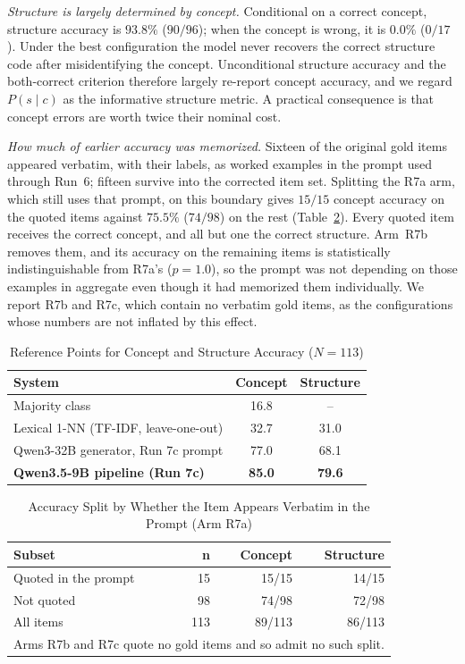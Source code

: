 \documentclass[onecolumn, 11pt]{IEEEtran}
\begin{document}
\emph{Structure is largely determined by concept.} Conditional on a correct concept, structure accuracy is $93.8\%$ ($90/96$); when the concept is wrong, it is $0.0\%$ ($0/17$). Under the best configuration the model never recovers the correct structure code after misidentifying the concept. Unconditional structure accuracy and the both-correct criterion therefore largely re-report concept accuracy, and we regard $P(s \mid c)$ as the informative structure metric. A practical consequence is that concept errors are worth twice their nominal cost.

\emph{How much of earlier accuracy was memorized.} Sixteen of the original gold items appeared verbatim, with their labels, as worked examples in the prompt used through Run~6; fifteen survive into the corrected item set. Splitting the R7a arm, which still uses that prompt, on this boundary gives $15/15$ concept accuracy on the quoted items against $75.5\%$ ($74/98$) on the rest (Table~\ref{tab:leakage}). Every quoted item receives the correct concept, and all but one the correct structure. Arm~R7b removes them, and its accuracy on the remaining items is statistically indistinguishable from R7a's ($p=1.0$), so the prompt was not depending on those examples in aggregate even though it had memorized them individually. We report R7b and R7c, which contain no verbatim gold items, as the configurations whose numbers are not inflated by this effect.

\begin{table}[t]
\caption{Reference Points for Concept and Structure Accuracy ($N=113$)}
\label{tab:baselines}
\centering
\footnotesize
\begin{tabular}{l c c}
\hline
\textbf{System} & \textbf{Concept} & \textbf{Structure} \\
\hline
Majority class & 16.8 & -- \\
Lexical 1-NN (TF-IDF, leave-one-out) & 32.7 & 31.0 \\
Qwen3-32B generator, Run 7c prompt & 77.0 & 68.1 \\
\textbf{Qwen3.5-9B pipeline (Run 7c)} & \textbf{85.0} & \textbf{79.6} \\
\hline
\end{tabular}
\end{table}

\begin{table}[t]
\caption{Accuracy Split by Whether the Item Appears Verbatim in the Prompt (Arm R7a)}
\label{tab:leakage}
\centering
\footnotesize
\begin{tabular}{l r r r}
\hline
\textbf{Subset} & \textbf{n} & \textbf{Concept} & \textbf{Structure} \\
\hline
Quoted in the prompt & 15 & 15/15 & 14/15 \\
Not quoted & 98 & 74/98 & 72/98 \\
\hline
All items & 113 & 89/113 & 86/113 \\
\hline
\multicolumn{4}{l}{\scriptsize Arms R7b and R7c quote no gold items and so admit no such split.}
\end{tabular}
\end{table}
\end{document}

